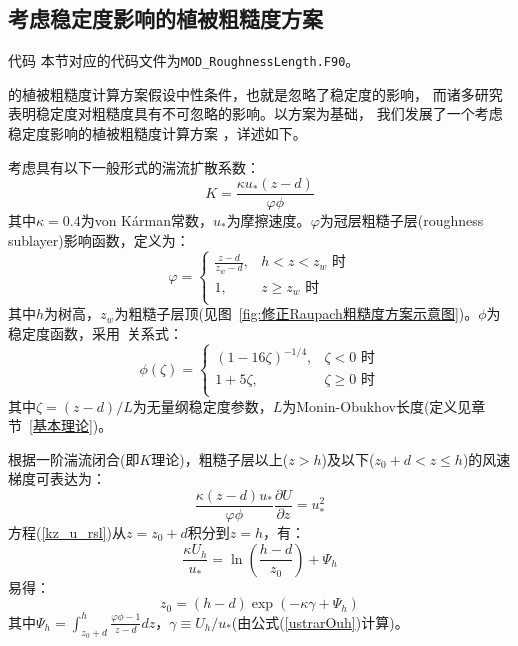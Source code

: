 \subsection{考虑稳定度影响的植被粗糙度方案}\label{考虑稳定度粗糙度方案}
\begin{mymdframed}{代码}
本节对应的代码文件为\texttt{MOD\_RoughnessLength.F90}。
\end{mymdframed}

\citet{raupach1992drag,raupach1994simplified}的植被粗糙度计算方案假设中性条件，也就是忽略了稳定度的影响，
而诸多研究表明稳定度对粗糙度具有不可忽略的影响。以\citet{raupach1992drag,raupach1994simplified}方案为基础，
我们发展了一个考虑稳定度影响的植被粗糙度计算方案 \citep{liu2023roughnesslength}，详述如下。

考虑具有以下一般形式的湍流扩散系数：
\begin{equation}\label{eddydiffusivity}
K=\frac{\kappa u_{*} (z-d)} {\varphi \phi }
\end{equation}
其中$\kappa=0.4$为von K\'arman常数，$u_{*}$为摩擦速度。$\varphi$为冠层粗糙子层(roughness sublayer)影响函数，定义为：
\begin{equation}
\varphi = \begin{cases}
   \frac{z-d} {z_{w}-d}, & h<z<z_{w} \text { 时} \\
   1, & z \geq z_{w} \text { 时} \\
\end{cases}
\end{equation}
其中$h$为树高，$z_{w}$为粗糙子层顶(见图~\ref{fig:修正Raupach粗糙度方案示意图})。$\phi$为稳定度函数，采用~\citet{dyer1974review}关系式：
\begin{equation}
\phi(\zeta) = \begin{cases}
   (1-16\zeta)^{-1/4}, & \zeta<0 \text { 时} \\
   1+5\zeta, & \zeta \geq 0 \text { 时} \\
\end{cases}
\end{equation}
其中$\zeta = (z-d)/L$为无量纲稳定度参数，$L$为Monin-Obukhov长度(定义见章节~\ref{基本理论})。

根据一阶湍流闭合(即$K$理论)，粗糙子层以上($z>h$)及以下($z_0 + d<z \leq h$)的风速梯度可表达为：
\begin{equation}\label{kz_u_rsl}
\frac{\kappa (z-d) u_{*}}{\varphi \phi} \frac{\partial U}{\partial z}=u_{*}^2
\end{equation}
方程(\ref{kz_u_rsl})从$z=z_0+d$积分到$z=h$，有：
\begin{equation}\label{u_rsl_htop}
\frac{\kappa U_{h}}{u_{*}} = \ln \left(\frac{h-d}{z_{0}}\right) + \Psi_{h}
\end{equation}
易得：
\begin{equation}\label{z0_rsl}
z_{0} = (h-d)\exp (-\kappa \gamma + \Psi_{h})
\end{equation}
其中$\Psi_{h}=\int_{z_{0}+d}^{h} \frac{\varphi \phi - 1}{z-d} d z$，$\gamma \equiv U_{h}/u_{*}$(由公式(\ref{ustrarOuh})计算)。


